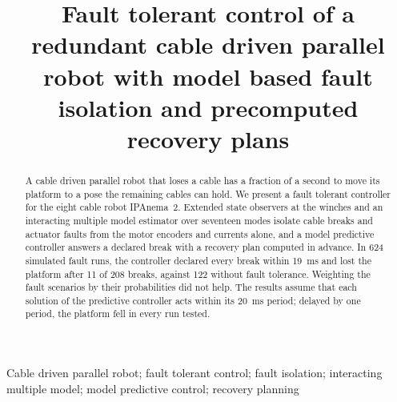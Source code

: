 \documentclass{interact}
\newif\ifblind
\begin{document}

\title{Fault tolerant control of a redundant cable driven parallel robot with model based fault isolation and precomputed recovery plans}

\ifblind
\maketitle
\else
\author{
}
\maketitle
\fi

\begin{abstract}
A cable driven parallel robot that loses a cable has a fraction of a second to move its platform to a pose the remaining cables can hold. We present a fault tolerant controller for the eight cable robot IPAnema~2. Extended state observers at the winches and an interacting multiple model estimator over seventeen modes isolate cable breaks and actuator faults from the motor encoders and currents alone, and a model predictive controller answers a declared break with a recovery plan computed in advance. In 624 simulated fault runs, the controller declared every break within 19~ms and lost the platform after 11 of 208 breaks, against 122 without fault tolerance. Weighting the fault scenarios by their probabilities did not help. The results assume that each solution of the predictive controller acts within its 20~ms period; delayed by one period, the platform fell in every run tested.
\end{abstract}

\begin{keywords}
Cable driven parallel robot; fault tolerant control; fault isolation; interacting multiple model; model predictive control; recovery planning
\end{keywords}

\end{document}
